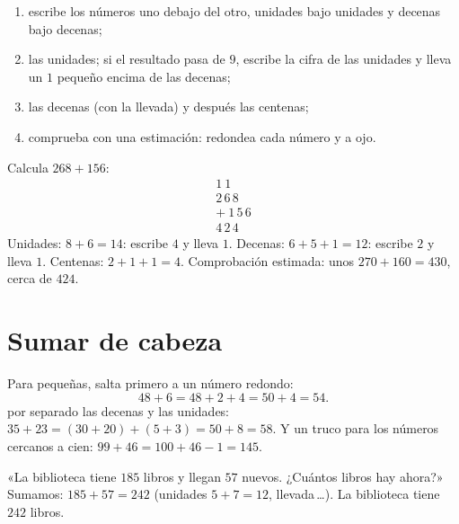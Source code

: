 \begin{method}\label{met:g2:addition:column}
\begin{enumerate}
  \item escribe los números uno debajo del otro, unidades bajo unidades
        y decenas bajo decenas;
  \item {} las unidades; si el resultado pasa de $9$, escribe la cifra de las
        unidades y lleva un $1$ pequeño encima de las decenas;
  \item {} las decenas (con la llevada) y después las centenas;
  \item comprueba con una estimación: redondea cada número y  a ojo.
\end{enumerate}
\end{method}

\begin{example}\label{ex:g2:addition:worked}
Calcula $268 + 156$:
\[
\begin{array}{r}
{\scriptstyle 1}\ {\scriptstyle 1}\ \phantom{0} \\[-3pt]
2\,6\,8 \\
+\ 1\,5\,6 \\
\hline
4\,2\,4
\end{array}
\]
Unidades: $8 + 6 = 14$: escribe $4$ y lleva $1$. Decenas:
$6 + 5 + 1 = 12$: escribe $2$ y lleva $1$. Centenas:
$2 + 1 + 1 = 4$. Comprobación estimada: unos $270 + 160 = 430$, cerca de
$424$. \checkmark
\end{example}

\section{Sumar de cabeza}

\begin{example}\label{ex:g2:addition:mental}
Para  pequeñas, salta primero a un número redondo:
\[
48 + 6 = 48 + 2 + 4 = 50 + 4 = 54 .
\]
 por separado las decenas y las unidades:
$35 + 23 = (30 + 20) + (5 + 3) = 50 + 8 = 58$. Y un truco para los números
cercanos a cien: $99 + 46 = 100 + 46 - 1 = 145$.
\end{example}

\begin{example}\label{ex:g2:addition:problem}
«La biblioteca tiene $185$ libros y llegan $57$ nuevos. ¿Cuántos libros
hay ahora?» Sumamos: $185 + 57 = 242$ (unidades $5 + 7 = 12$, llevada\,\dots).
La biblioteca tiene $242$ libros.
\end{example}

